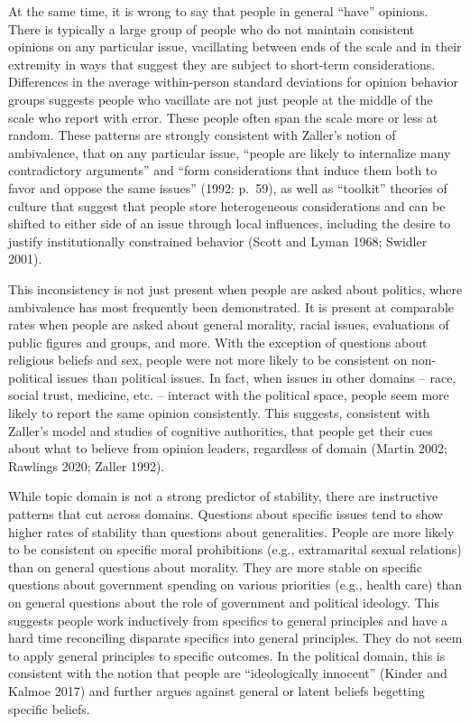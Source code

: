 \documentclass[12pt,]{article}
\begin{document}
At the same time, it is wrong to say that people in general ``have'' opinions. There is typically a large group of people who do not maintain consistent opinions on any particular issue, vacillating between ends of the scale and in their extremity in ways that suggest they are subject to short-term considerations. Differences in the average within-person standard deviations for opinion behavior groups suggests people who vacillate are not just people at the middle of the scale who report with error. These people often span the scale more or less at random. These patterns are strongly consistent with Zaller's notion of ambivalence, that on any particular issue, ``people are likely to internalize many contradictory arguments'' and ``form considerations that induce them both to favor and oppose the same issues'' (1992: p.~59), as well as ``toolkit'' theories of culture that suggest that people store heterogeneous considerations and can be shifted to either side of an issue through local influences, including the desire to justify institutionally constrained behavior (Scott and Lyman 1968; Swidler 2001).

This inconsistency is not just present when people are asked about politics, where ambivalence has most frequently been demonstrated. It is present at comparable rates when people are asked about general morality, racial issues, evaluations of public figures and groups, and more. With the exception of questions about religious beliefs and sex, people were not more likely to be consistent on non-political issues than political issues. In fact, when issues in other domains -- race, social trust, medicine, etc. -- interact with the political space, people seem more likely to report the same opinion consistently. This suggests, consistent with Zaller's model and studies of cognitive authorities, that people get their cues about what to believe from opinion leaders, regardless of domain (Martin 2002; Rawlings 2020; Zaller 1992).

While topic domain is not a strong predictor of stability, there are instructive patterns that cut across domains. Questions about specific issues tend to show higher rates of stability than questions about generalities. People are more likely to be consistent on specific moral prohibitions (e.g., extramarital sexual relations) than on general questions about morality. They are more stable on specific questions about government spending on various priorities (e.g., health care) than on general questions about the role of government and political ideology. This suggests people work inductively from specifics to general principles and have a hard time reconciling disparate specifics into general principles. They do not seem to apply general principles to specific outcomes. In the political domain, this is consistent with the notion that people are ``ideologically innocent'' (Kinder and Kalmoe 2017) and further argues against general or latent beliefs begetting specific beliefs.
\end{document}
